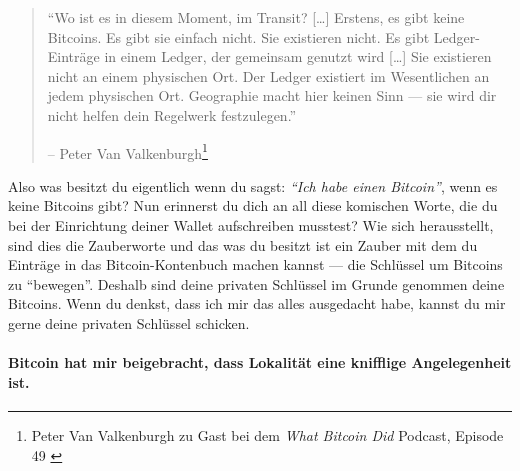 \begin{quotation}\begin{samepage}
\enquote{Wo ist es in diesem Moment, im Transit? [\ldots] Erstens, es gibt keine
Bitcoins. Es gibt sie einfach nicht. Sie existieren nicht. Es gibt
Ledger-Einträge in einem Ledger, der gemeinsam genutzt wird [\ldots] Sie
existieren nicht an einem physischen Ort. Der Ledger existiert im Wesentlichen
an jedem physischen Ort. Geographie macht hier keinen Sinn --- sie wird dir
nicht helfen dein Regelwerk festzulegen.}
\begin{flushright} -- Peter Van Valkenburgh\footnote{Peter Van Valkenburgh zu Gast bei dem \textit{What Bitcoin Did} Podcast, Episode 49 \cite{wbd049}}
\end{flushright}\end{samepage}\end{quotation}

Also was besitzt du eigentlich wenn du sagst: \textit{\enquote{Ich habe einen
Bitcoin}}, wenn es keine Bitcoins gibt? Nun erinnerst du dich an all diese
komischen Worte, die du bei der Einrichtung deiner Wallet aufschreiben musstest?
Wie sich herausstellt, sind dies die Zauberworte und das was du besitzt ist ein
Zauber mit dem du Einträge in das Bitcoin-Kontenbuch machen kannst — die
Schlüssel um Bitcoins zu \enquote{bewegen}. Deshalb sind deine privaten
Schlüssel im Grunde genommen deine Bitcoins. Wenn du denkst, dass ich mir das
alles ausgedacht habe, kannst du mir gerne deine privaten Schlüssel schicken.

\paragraph{Bitcoin hat mir beigebracht, dass Lokalität eine knifflige
Angelegenheit ist.}

%
%
%
%
%
%
%

